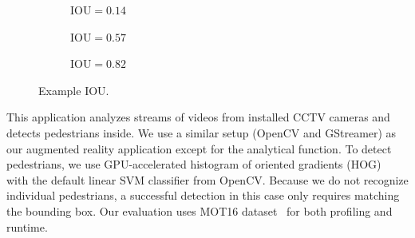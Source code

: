 \begin{figure}
  \begin{subfigure}{0.3\textwidth}
    \centering
    \caption{$\text{IOU} = 0.14$}
  \end{subfigure}
  \begin{subfigure}{0.3\textwidth}
    \centering
    \caption{$\text{IOU} = 0.57$}
  \end{subfigure}
  \begin{subfigure}{0.3\textwidth}
    \centering
    \caption{$\text{IOU} = 0.82$}
  \end{subfigure}
  \caption{Example IOU.}
\end{figure}


 This application analyzes streams of videos from
installed CCTV cameras and detects pedestrians inside. We use a similar setup
(OpenCV and GStreamer) as our augmented reality application except for the
analytical function. To detect pedestrians, we use GPU-accelerated histogram of
oriented gradients (HOG)~\cite{dalal2005histograms} with the default linear SVM
classifier from OpenCV. Because we do not recognize individual pedestrians, a
successful detection in this case only requires matching the bounding box. Our
evaluation uses MOT16 dataset~\cite{milan2016mot16} for both profiling and
runtime.

